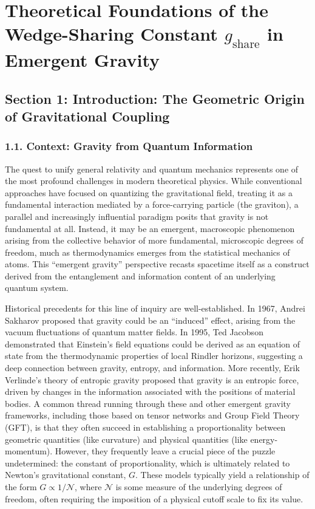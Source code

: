 \documentclass[11pt]{article}
\begin{document}
\appendix
\section*{Theoretical Foundations of the Wedge-Sharing Constant $g_{\mathrm{share}}$ in Emergent Gravity}

\subsection*{Section 1: Introduction: The Geometric Origin of Gravitational Coupling}

\subsubsection*{1.1. Context: Gravity from Quantum Information}
The quest to unify general relativity and quantum mechanics represents one of the most profound challenges in modern theoretical physics. While conventional approaches have focused on quantizing the gravitational field, treating it as a fundamental interaction mediated by a force-carrying particle (the graviton), a parallel and increasingly influential paradigm posits that gravity is not fundamental at all. Instead, it may be an emergent, macroscopic phenomenon arising from the collective behavior of more fundamental, microscopic degrees of freedom, much as thermodynamics emerges from the statistical mechanics of atoms. This “emergent gravity” perspective recasts spacetime itself as a construct derived from the entanglement and information content of an underlying quantum system.

Historical precedents for this line of inquiry are well-established. In 1967, Andrei Sakharov proposed that gravity could be an “induced” effect, arising from the vacuum fluctuations of quantum matter fields. In 1995, Ted Jacobson demonstrated that Einstein’s field equations could be derived as an equation of state from the thermodynamic properties of local Rindler horizons, suggesting a deep connection between gravity, entropy, and information. More recently, Erik Verlinde’s theory of entropic gravity proposed that gravity is an entropic force, driven by changes in the information associated with the positions of material bodies. A common thread running through these and other emergent gravity frameworks, including those based on tensor networks and Group Field Theory (GFT), is that they often succeed in establishing a proportionality between geometric quantities (like curvature) and physical quantities (like energy-momentum). However, they frequently leave a crucial piece of the puzzle undetermined: the constant of proportionality, which is ultimately related to Newton’s gravitational constant, $G$. These models typically yield a relationship of the form $G \propto 1/\mathcal{N}$, where $\mathcal{N}$ is some measure of the underlying degrees of freedom, often requiring the imposition of a physical cutoff scale to fix its value.
\end{document}
